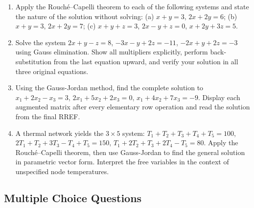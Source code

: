 \documentclass[12pt,a4paper]{article}
\begin{document}
\begin{enumerate}[leftmargin=2em, label=\textbf{D\arabic*.}]
  \item Apply the Rouch\'{e}--Capelli theorem to each of the following systems and state the nature of the
        solution without solving:
        (a) $x + y = 3$, $2x + 2y = 6$;\quad
        (b) $x + y = 3$, $2x + 2y = 7$;\quad
        (c) $x + y + z = 3$, $2x - y + z = 0$, $x + 2y + 3z = 5$.

  \item Solve the system $2x + y - z = 8$, $-3x - y + 2z = -11$, $-2x + y + 2z = -3$ using
        Gauss elimination. Show all multipliers explicitly, perform back-substitution from the
        last equation upward, and verify your solution in all three original equations.

  \item Using the Gauss-Jordan method, find the complete solution to
        $x_1 + 2x_2 - x_3 = 3$, $2x_1 + 5x_2 + 2x_3 = 0$, $x_1 + 4x_2 + 7x_3 = -9$.
        Display each augmented matrix after every elementary row operation and read the solution
        from the final RREF.

  \item A thermal network yields the $3 \times 5$ system:
        $T_1 + T_2 + T_3 + T_4 + T_5 = 100$,
        $2T_1 + T_2 + 3T_3 - T_4 + T_5 = 150$,
        $T_1 + 2T_2 + T_3 + 2T_4 - T_5 = 80$.
        Apply the Rouch\'{e}--Capelli theorem, then use Gauss-Jordan to find the general solution
        in parametric vector form. Interpret the free variables in the context of unspecified node temperatures.
\end{enumerate}

\subsection*{Multiple Choice Questions}
\end{document}
